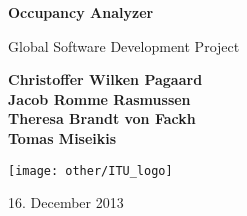\begin{titlepage}
	\begin{center}
		\vspace*{1cm}
		
		\Huge
		\textbf{Occupancy Analyzer}
		
		\vspace{0.5cm}
		\LARGE
		Global Software Development Project
		
		\vspace{1.5cm}
		
		\textbf{
			Christoffer Wilken Pagaard\\
			Jacob Romme Rasmussen\\
			Theresa Brandt von Fackh\\
			Tomas Miseikis\\
		}
		
		\vfill

		\vspace{0.8cm}
		
		\texttt{[image: other/ITU\_logo]}
		
		\Large
		16. December 2013
		
	\end{center}
\end{titlepage}